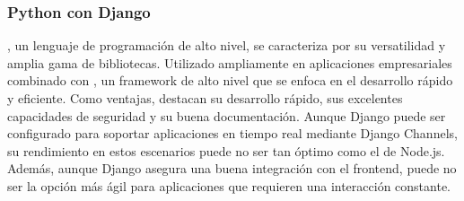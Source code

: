\subsubsection{Python con Django}
, un lenguaje de programación de alto nivel, se caracteriza por su versatilidad y amplia gama de bibliotecas. Utilizado ampliamente en 
aplicaciones empresariales combinado con , un framework de alto nivel que se enfoca en el desarrollo rápido y eficiente.
Como ventajas, destacan su desarrollo rápido, sus excelentes capacidades de seguridad y su buena documentación.
Aunque Django puede ser configurado para soportar aplicaciones en tiempo real mediante Django Channels, su rendimiento en estos escenarios puede no ser tan óptimo como el de Node.js. Además, aunque Django asegura una buena integración con el frontend, puede no ser la opción más ágil para aplicaciones que requieren una interacción constante.



